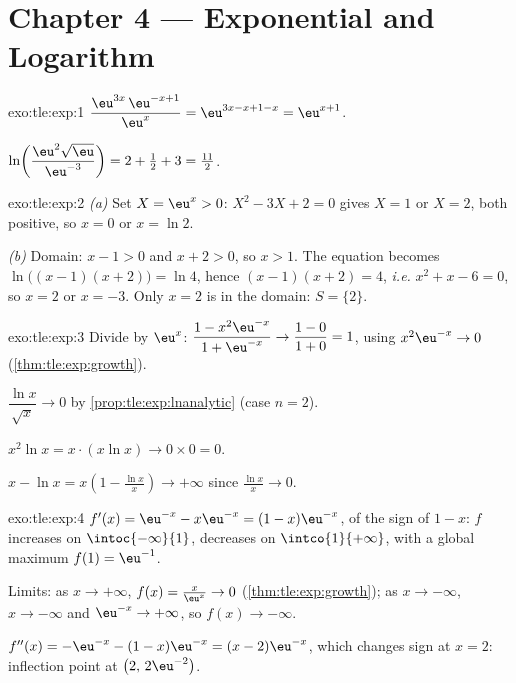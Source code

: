 \section*{Chapter 4 --- Exponential and Logarithm}

\begin{solution}{exo:tle:exp:1}
$\dfrac{\eu^{3x}\,\eu^{-x+1}}{\eu^{x}} = \eu^{3x - x + 1 - x} = \eu^{x+1}$.

$\ln\!\left(\dfrac{\eu^2\sqrt{\eu}}{\eu^{-3}}\right)
= 2 + \tfrac12 + 3 = \tfrac{11}{2}$.
\end{solution}

\begin{solution}{exo:tle:exp:2}
\emph{(a)} Set $X = \eu^x > 0$: $X^2 - 3X + 2 = 0$ gives $X = 1$ or $X = 2$,
both positive, so $x = 0$ or $x = \ln 2$.

\emph{(b)} Domain: $x - 1 > 0$ and $x + 2 > 0$, so $x > 1$. The equation
becomes $\ln\bigl((x-1)(x+2)\bigr) = \ln 4$, hence $(x-1)(x+2) = 4$,
\emph{i.e.} $x^2 + x - 6 = 0$, so $x = 2$ or $x = -3$. Only $x = 2$ is in the
domain: $S = \{2\}$.
\end{solution}

\begin{solution}{exo:tle:exp:3}
Divide by $\eu^x$:
$\dfrac{1 - x^2\eu^{-x}}{1 + \eu^{-x}} \to \dfrac{1-0}{1+0} = 1$, using
$x^2 \eu^{-x} \to 0$ (\cref{thm:tle:exp:growth}).

$\dfrac{\ln x}{\sqrt x} \to 0$ by \cref{prop:tle:exp:lnanalytic} (case
$n = 2$).

$x^2 \ln x = x \cdot (x \ln x) \to 0 \times 0 = 0$.

$x - \ln x = x\left(1 - \frac{\ln x}{x}\right) \to +\infty$ since
$\frac{\ln x}{x} \to 0$.
\end{solution}

\begin{solution}{exo:tle:exp:4}
$f'(x) = \eu^{-x} - x\eu^{-x} = (1 - x)\eu^{-x}$, of the sign of $1 - x$:
$f$ increases on $\intoc{-\infty}{1}$, decreases on $\intco{1}{+\infty}$,
with a global maximum $f(1) = \eu^{-1}$.

Limits: as $x \to +\infty$, $f(x) = \frac{x}{\eu^x} \to 0$
(\cref{thm:tle:exp:growth}); as $x \to -\infty$, $x \to -\infty$ and
$\eu^{-x} \to +\infty$, so $f(x) \to -\infty$.

$f''(x) = -\eu^{-x} - (1-x)\eu^{-x} = (x - 2)\eu^{-x}$, which changes sign at
$x = 2$: inflection point at $\bigl(2,\, 2\eu^{-2}\bigr)$.
\end{solution}

